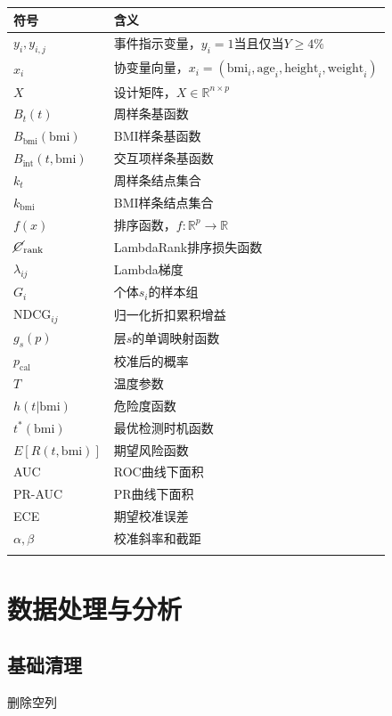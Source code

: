 \documentclass[12pt,a4paper]{ctexart}
\numberwithin{equation}{section}
\newcommand{\toprulethick}{\specialrule{1pt}{1pt}{1pt}}
\newcommand{\bottomrulethick}{\specialrule{1pt}{1pt}{1pt}}
\theoremstyle{mcm}
\begin{document}
\begin{longtable}{p{}p{}}
\toprulethick
符号 & 含义 \\
\midrule
\( y_i, y_{i,j} \) & 事件指示变量，\( y_i = 1 \)当且仅当\( Y \geq 4\% \)  \\
\( x_i \) & 协变量向量，\( x_i = (\text{bmi}_i, \text{age}_i, \text{height}_i, \text{weight}_i) \) \\
\( X \) & 设计矩阵，\( X \in \mathbb{R}^{n \times p} \)  \\
\( B_t(t) \) & 周样条基函数  \\
\( B_{\text{bmi}}(\text{bmi}) \) & BMI样条基函数  \\
\( B_{\text{int}}(t, \text{bmi}) \) & 交互项样条基函数  \\
\( k_t \) & 周样条结点集合 \\
\( k_{\text{bmi}} \) & BMI样条结点集合  \\
\( f(x) \) & 排序函数，\( f : \mathbb{R}^p \to \mathbb{R} \)  \\
\( \cancel{C}_{\text{rank}} \) & LambdaRank排序损失函数 \\
\( \lambda_{ij} \) & Lambda梯度 \\
\( G_i \) & 个体\( s_i \)的样本组  \\
\( \text{NDCG}_{ij} \) & 归一化折扣累积增益  \\
\( g_s(p) \) & 层\( s \)的单调映射函数  \\
\( p_{\text{cal}} \) & 校准后的概率 \\
\( T \) & 温度参数 \\
\( h(t|\text{bmi}) \) & 危险度函数 \\
\( t^*(\text{bmi}) \) & 最优检测时机函数  \\
\( E[R(t, \text{bmi})] \) & 期望风险函数  \\
AUC & ROC曲线下面积  \\
PR-AUC & PR曲线下面积 \\
ECE & 期望校准误差  \\
\( \alpha, \beta \) & 校准斜率和截距  \\
\bottomrulethick
\end{longtable}

\section{数据处理与分析}
\subsection{基础清理}
删除空列
\end{document}
